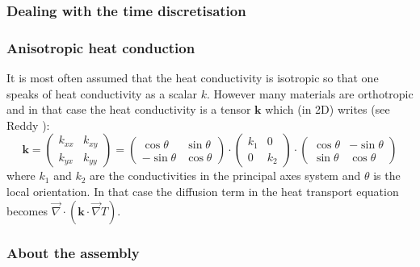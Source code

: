 \subsubsection{Dealing with the time discretisation} \label{sec:timediscr}


\subsubsection{Anisotropic heat conduction}\label{sec:anisotropic}


It is most often assumed that the heat conductivity is isotropic so that one speaks of heat conductivity as a 
scalar $k$.  However many materials are orthotropic and in that case the heat conductivity is a 
tensor ${\bm k}$ which (in 2D) writes (see Reddy \cite[p121]{reddybook2}):
\[
{\bm k}
=
\left(
\begin{array}{cc}
k_{xx} & k_{xy} \\
k_{yx} & k_{yy}
\end{array}
\right)
=
\left(
\begin{array}{cc}
\cos\theta & \sin\theta \\
-\sin\theta & \cos\theta
\end{array}
\right)
\cdot
\left(
\begin{array}{cc}
k_1 & 0 \\ 0 & k_2
\end{array}
\right)
\cdot
\left(
\begin{array}{cc}
\cos\theta & -\sin\theta \\
\sin\theta & \cos\theta
\end{array}
\right)
\]
where $k_1$ and $k_2$ are the conductivities in the principal axes system and $\theta$ is 
the local orientation.
In that case the diffusion term in the heat transport equation becomes $\vec{\nabla}\cdot({\bm k}\cdot \vec{\nabla}T)$.





\subsubsection{About the assembly}

